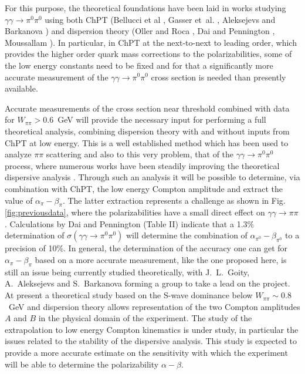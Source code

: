 For
this purpose, the theoretical foundations have been laid in works
studying $\gamma\gamma\to \pi^0\pi^0$ using both ChPT (Bellucci et al
\cite{Bellucci:1994hx,Bellucci:1994eb}, Gasser et~al.
\cite{Gasser:2005ud}, Aleksejevs and Barkanova
\cite{Aleksejevs:2014eea}) and dispersion theory (Oller and Roca
\cite{Oller:2008kf}, Dai and Pennington
\cite{Dai:2014zta,Dai:2014lza}, Moussallam
\cite{Moussallam:2013una}). In particular, in ChPT at the next-to-next
to leading order, which provides the higher order quark mass
corrections to the polarizabilities, some of the low energy constants
need to be fixed and for that a significantly more accurate
measurement of the $\gamma\gamma\to \pi^0\pi^0$ cross section is
needed than presently available.

Accurate measurements of the cross section near threshold combined
with data for $W_{\pi\pi}>0.6$~GeV will provide the necessary input
for performing a full theoretical analysis, combining dispersion
theory with and without inputs from ChPT at low energy. This is a well
established method which has been used to analyze $\pi\pi$
scattering and also to this very problem, that of the $\gamma\gamma \to \pi^0\pi^0$
process, where numerous works have been steadily improving the theoretical
dispersive analysis \cite{Donoghue:1993kw,Oller:2007sh,Oller:2008kf,Moussallam:2013una,Dai:2016ytz}.
Through such an analysis it will be possible to determine,
via combination with ChPT, the low energy Compton amplitude and
extract the value of $\alpha_\pi-\beta_\pi$. The
latter extraction represents a challenge as shown in
Fig.\,\ref{fig:previousdata}, where the polarizabilities have a small
direct effect on $\gamma\gamma\to \pi\pi$.  Calculations by Dai and
Pennington (Table II) \cite{Dai:2016ytz} indicate that a 1.3\%
determination of $\sigma(\gamma\gamma\rightarrow\pi^0\pi^0)$ will
determine the combination of $\alpha_{\pi^0}-\beta_{\pi^0}$ to a
precision of 10\%. 
In general, the
determination of the accuracy one can get for $\alpha_\pi-\beta_\pi$
based on a more accurate measurement, like the one proposed here, is still
an issue being currently studied theoretically, with J.~L.~Goity,
A.~Aleksejevs and S.~Barkanova forming a group to take a lead on the project. 
At present a theoretical study based on the S-wave dominance below
$W_{\pi\pi}\sim 0.8$~GeV and dispersion theory allows representation of the two
Compton amplitudes $A$ and $B$ in the physical domain of the experiment. The
study of the extrapolation to low energy Compton kinematics is under study, in
particular the issues related to the stability of the dispersive analysis. This
study is expected to provide a more accurate estimate on the sensitivity with
which the experiment will be able to determine the polarizability
$\alpha-\beta$.


